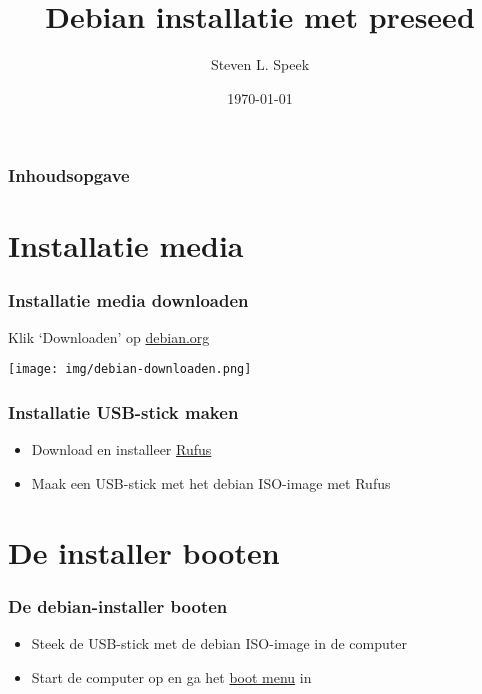 \documentclass{beamer}
\title[Debian installatie] %
{Debian installatie met preseed}
\author[S.L.Speek] %
{Steven L. Speek}
\institute[ACC] %
{
  Actief Computer Centrum
}
\date[\today{}] %
{\today{}}
\begin{document}
\frame{\titlepage}


\begin{frame}
\frametitle{Inhoudsopgave}
\tableofcontents
\end{frame}


\section{Installatie media}

\begin{frame}
\frametitle{Installatie media downloaden}
Klik `Downloaden' op \href{https://debian.org}{debian.org}

\centering
\texttt{[image: img/debian-downloaden.png]} 
\end{frame}

\begin{frame}
  \frametitle{Installatie USB-stick maken}
\begin{itemize}
    \item Download en installeer \href{https://rufus.ie}{Rufus}
    \item Maak een USB-stick met het debian ISO-image met Rufus
\end{itemize}
\end{frame}



\section{De installer booten}

\begin{frame}
  \frametitle{De \textbf{debian-installer} booten}
  \begin{itemize}
    \item Steek de USB-stick met de debian ISO-image in de computer
    \item Start de computer op en ga het \href{https://www.boot-disk.com/quest_bootmenu.htm}{boot menu} in
  \end{itemize}

\end{frame}
\end{document}
